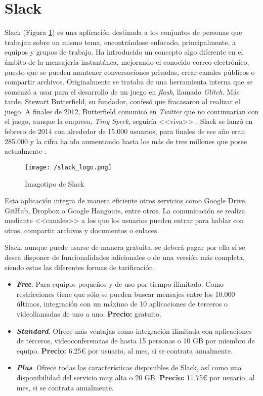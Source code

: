 \section{Slack}
\label{sec:slack}

Slack (Figura \ref{fig:slack}) es una aplicación destinada a los conjuntos de personas que trabajan sobre un mismo tema, encontrándose enfocado, principalmente, a equipos y grupos de trabajo. Ha introducido un concepto algo diferente en el ámbito de la mensajería instantánea, mejorando el conocido correo electrónico, puesto que se pueden mantener conversaciones privadas, crear canales públicos o compartir archivos. Originalmente se trataba de una herramienta interna que se comenzó a usar para el desarrollo de un juego en \textit{flash}, llamado \textit{Glitch}. Más tarde, Stewart Butterfield, su fundador, confesó que fracasaron al realizar el juego. A finales de 2012, Butterfield comunicó en \textit{Twitter} que no continuarían con el juego, aunque la empresa, \textit{Tiny Speck}, seguiría <<viva>> \cite{Thomas2015}. Slack se lanzó en febrero de 2014 con alrededor de 15.000 usuarios, para finales de ese año eran 285.000 y la cifra ha ido aumentando hasta los más de tres millones que posee actualmente \cite{PyMEs2017}.

\begin{figure}[!h]
	\begin{center}
		\texttt{[image: /slack\_logo.png]}
		\caption{Imagotipo de Slack}
		\label{fig:slack}
	\end{center}
\end{figure}

Esta aplicación integra de manera eficiente otros servicios como Google Drive, GitHub, Dropbox o Google Hangouts, entre otros. La comunicación se realiza mediante <<canales>> a los que los usuarios pueden entrar para hablar con otros, compartir archivos y documentos o enlaces.

\clearpage

Slack, aunque puede usarse de manera gratuita, se deberá pagar por ella si se desea disponer de funcionalidades adicionales o de una versión más completa, siendo estas las diferentes formas de tarificación:

\begin{itemize}
	\item \textbf{\textit{Free}}. Para equipos pequeños y de uso por tiempo ilimitado. Como restricciones tiene que sólo se pueden buscar mensajes entre los 10.000 últimos, integración con un máximo de 10 aplicaciones de terceros o videollamadas de uno a uno. \textbf{Precio:} gratuito.
	\item \textbf{\textit{Standard}}. Ofrece más ventajas como integración ilimitada con aplicaciones de terceros, videoconferencias de hasta 15 personas o 10 \acs{GB} por miembro de equipo. \textbf{Precio:} 6.25\euro{} por usuario, al mes, si se contrata anualmente.
	\item \textbf{\textit{Plus}}. Ofrece todas las características disponibles de Slack, así como una disponibilidad del servicio muy alta o 20 \acs{GB}. \textbf{Precio:} 11.75\euro{} por usuario, al mes, si se contrata anualmente.
\end{itemize}

